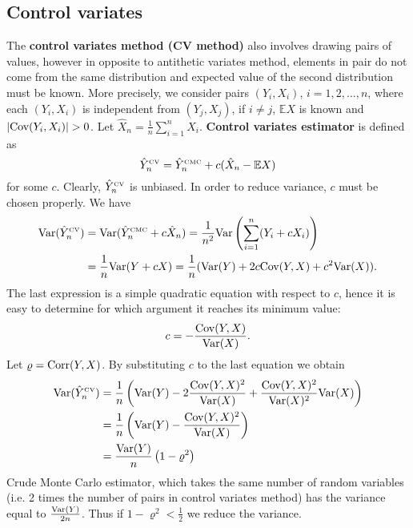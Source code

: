 \documentclass[a4paper,11pt, twoside]{book}
\theoremstyle{definition}
\theoremstyle{remark}
\def\Var{{\rm Var}}
\def\E{{\mathbb{E}}}
\def\Cov{{\hbox{Cov}}}
\def\Corr{{\hbox{Corr}}}
\def\CMC[#1]{\hat{Y}^{\hbox{\tiny CMC}}_{#1}}
\def\CV[#1]{\hat{Y}^{\hbox{\tiny CV}}_{#1}}
\begin{document}
\subsection{Control variates}
The \textbf{control variates method (CV method)} also involves drawing pairs of values, however in opposite to antithetic variates method, elements in pair do not come from the same distribution and expected value of the second distribution must be known. More precisely, we consider pairs $(Y_i, X_i)$, $i=1,2,...,n$, where each $(Y_i, X_i)$ is independent from $(Y_j, X_j)$,
if $i \neq j$, $\E X$ is known and $|\Cov(Y_i, X_i)| > 0$. Let $\hat{X}_n = \frac{1}{n}\sum_{i=1}^n X_i$. \textbf{Control variates estimator} is defined as
\begin{equation}
 \label{eq:CV}
 \CV[n] = \CMC[n] + c(\hat{X}_n - \E X)
\end{equation}
for some $c$. Clearly, $\CV[n]$ is unbiased. In order to reduce variance, $c$ must be chosen properly. We have
\begin{equation*}
 \begin{split}
 \Var( \CV[n] ) &= \Var( \CMC[n] + c\hat{X}_n ) = \frac{1}{n^2} \Var \left( \sum\limits_{i=1}^n( Y_i + c X_i) \right) \\
                &= \frac{1}{n}\Var(Y + c X) = \frac{1}{n}( \Var(Y) + 2c\Cov(Y,X) + c^2 \Var(X)).
 \end{split}
\end{equation*}
The last expression is a simple quadratic equation with respect to $c$, hence it is easy to determine for which argument it reaches its minimum value:
\[ c = -\frac{\Cov(Y,X)}{\Var(X)}. \]
Let $\varrho = \Corr(Y,X)$. By substituting $c$ to the last equation we obtain
\begin{equation}
 \begin{split}
 \Var( \CV[n] ) &=  \frac{1}{n} \left( \Var(Y) - 2\frac{\Cov(Y,X)^2}{\Var(X)} + \frac{\Cov(Y,X)^2}{\Var(X)^2} \Var(X) \right) \\
 &= \frac{1}{n} \left( \Var(Y) - \frac{\Cov(Y,X)^2}{\Var(X)}  \right) \\
 &= \frac{\Var(Y)}{n} \left( 1 - \varrho^2  \right) \label{eq:VarCV}
 \end{split}
\end{equation}
Crude Monte Carlo estimator, which takes the same number of random variables (i.e. 2 times the number of pairs in control variates method) has the variance equal to $\frac{\Var(Y)}{2n}$. Thus if $1 - \varrho^2 < \frac{1}{2}$ we reduce the variance.
\end{document}
